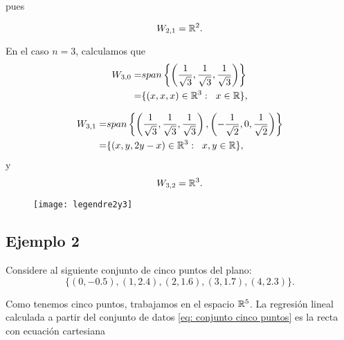 {pues

\begin{equation}
\label{eq1: 1Dic}
W_{2,1}= \mathbb{R}^{2}.
\end{equation}


En el caso $n=3$, calculamos que
\begin{align*}
W_{3,0}= & span \left\{
\left( \frac{1}{\sqrt3}, \frac{1}{\sqrt3},
\frac{1}{\sqrt3} \right) \right\}  \\
= & \{ (x,x,x) \in \mathbb{R}^{3}: \hspace{0.2cm} x \in \mathbb{R} \},
\end{align*}

\begin{align}
\label{eq2: 1Dic}
W_{3,1}= & span \left\{ \left( \frac{1}{\sqrt3}, \frac{1}{\sqrt3},
\frac{1}{\sqrt3} \right) ,
\left( -\frac{1}{\sqrt2}, 0,  \frac{1}{\sqrt2} \right) \right\}
\nonumber \\
= & \{ (x,y,2y-x) \in \mathbb{R}^{3}: \hspace{0.2cm} x,y \in \mathbb{R} \},
\end{align}
y
\[
W_{3,2}=\mathbb{R}^{3}.
\]

\begin{figure}[H]
	\centering
	\texttt{[image: legendre2y3]} 
\end{figure}	
	 
\final





\subsection{Ejemplo 2}
\label{subs: ejm 2}

Considere al siguiente conjunto de cinco
puntos del plano:
\begin{equation} \label{eq: conjunto cinco puntos}
\{ (0,-0.5), (1,2.4), (2, 1.6), (3,1.7), (4, 2.3) \}.
\end{equation}


Como tenemos cinco puntos, trabajamos
en el espacio $\mathbb{R}^{5}$. 
La regresión lineal calculada a partir
del conjunto de datos
\eqref{eq: conjunto cinco puntos}
es la recta
con ecuación cartesiana

}
